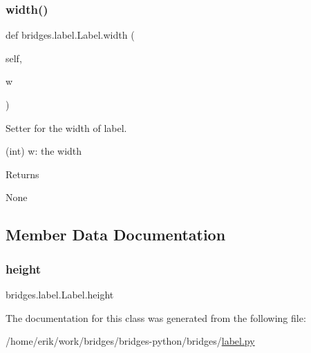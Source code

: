 \subsubsection{\texorpdfstring{width()}{width()}\hspace{0.1cm}{\footnotesize\ttfamily [2/2]}}
{\footnotesize\ttfamily def bridges.\+label.\+Label.\+width (\begin{DoxyParamCaption}\item[{}]{self,  }\item[{}]{w }\end{DoxyParamCaption})}



Setter for the width of label. 

(int) w\+: the width \begin{DoxyReturn}{Returns}


None 
\end{DoxyReturn}


\subsection{Member Data Documentation}
\mbox{\label{classbridges_1_1label_1_1_label_a2bf622aa77b4ad7d6918db99a8bfd4da}} 
\subsubsection{\texorpdfstring{height}{height}}
{\footnotesize\ttfamily bridges.\+label.\+Label.\+height}



The documentation for this class was generated from the following file\+:\begin{DoxyCompactItemize}
\item 
/home/erik/work/bridges/bridges-\/python/bridges/\hyperlink{label_8py}{label.\+py}\end{DoxyCompactItemize}
